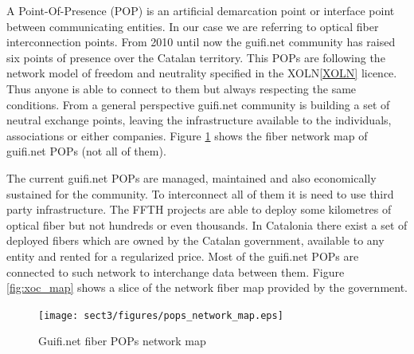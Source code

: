 A Point-Of-Presence (POP) is an artificial demarcation point or interface point between communicating entities.
In our case we are referring to optical fiber interconnection points.
From 2010 until now the guifi.net community has raised six points of presence over the Catalan territory.
This POPs are following the network model of freedom and neutrality specified in the XOLN\ref{XOLN} licence.
Thus anyone is able to connect to them but always respecting the same conditions.
From a general perspective guifi.net community is building a set of neutral exchange points, leaving the
infrastructure available to the individuals, associations or either companies.
\medskip
Figure \ref{fig:fibre_map} shows the fiber network map of guifi.net POPs (not all of them).

\bigskip

The current guifi.net POPs are managed, maintained and also economically sustained for the community. 
To interconnect all of them it is need to use third party infrastructure. The FFTH projects are able to deploy some kilometres
of optical fiber but not hundreds or even thousands.
\newline
In Catalonia there exist a set of deployed fibers which are owned by the Catalan government, available to any entity and 
rented for a regularized price. Most of the guifi.net POPs are connected to such network to interchange data
between them. Figure \ref{fig:xoc_map} shows a slice of the network fiber map provided by the government. 

\begin{figure}[htbp]
  \centering
  \texttt{[image: sect3/figures/pops\_network\_map.eps]} 
  \caption{Guifi.net fiber POPs network map}
  \label{fig:fibre_map}
\end{figure}

